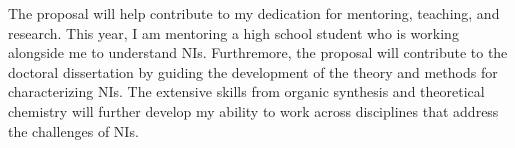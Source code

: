 \documentclass[11pt]{article}
\begin{document}
The proposal will help contribute to my dedication for mentoring, teaching, and research. 
This year, I am mentoring a high school student who is working alongside me to
understand NIs. Furthremore, the proposal will contribute to
the doctoral dissertation by guiding the development of the theory and methods for characterizing
NIs. The extensive skills from organic synthesis and theoretical chemistry will further
develop my ability to work across disciplines that address the challenges of NIs.


\printbibliography
\end{document}
